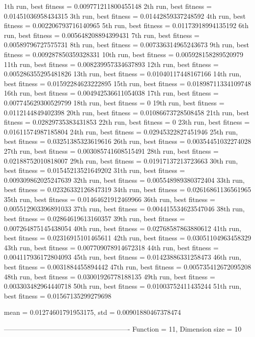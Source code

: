1th run, best fitness = 0.009771211800455148
2th run, best fitness = 0.01451036958434315
3th run, best fitness = 0.01442859337248592
4th run, best fitness = 0.002206793716140965
5th run, best fitness = 0.01173918994135192
6th run, best fitness = 0.005648208894399431
7th run, best fitness = 0.00589796727575731
8th run, best fitness = 0.007336314965243673
9th run, best fitness = 0.009287850359328331
10th run, best fitness = 0.005928158289520979
11th run, best fitness = 0.008239957334637893
12th run, best fitness = 0.005286355295481826
13th run, best fitness = 0.01040117448167166
14th run, best fitness = 0.01592284623222895
15th run, best fitness = 0.01898711334109748
16th run, best fitness = 0.004942536611054038
17th run, best fitness = 0.007745629300529799
18th run, best fitness = 0
19th run, best fitness = 0.0112144849402398
20th run, best fitness = 0.01086673728508458
21th run, best fitness = 0.02829735383431853
22th run, best fitness = 0
23th run, best fitness = 0.01611574987185804
24th run, best fitness = 0.02945322827451946
25th run, best fitness = 0.03251385323619616
26th run, best fitness = 0.00354451032274028
27th run, best fitness = 0.003085741608515491
28th run, best fitness = 0.02188752010818007
29th run, best fitness = 0.01917137213723663
30th run, best fitness = 0.01545213521649202
31th run, best fitness = 0.009309862025247639
32th run, best fitness = 0.005548989380372404
33th run, best fitness = 0.02326332126847319
34th run, best fitness = 0.02616861136561965
35th run, best fitness = 0.01464621912469966
36th run, best fitness = 0.005512903396891033
37th run, best fitness = 0.004415534623547046
38th run, best fitness = 0.02864619613160357
39th run, best fitness = 0.007264875145438054
40th run, best fitness = 0.02768587863880612
41th run, best fitness = 0.02316915101465611
42th run, best fitness = 0.03051104963458329
43th run, best fitness = 0.007709078914672318
44th run, best fitness = 0.004117936172804093
45th run, best fitness = 0.01423886331258473
46th run, best fitness = 0.0031884455894442
47th run, best fitness = 0.005735412672095208
48th run, best fitness = 0.03001926778188135
49th run, best fitness = 0.003303482964440718
50th run, best fitness = 0.01003752411435244
51th run, best fitness = 0.01567135299279698

mean = 0.01274601791953175, std = 0.00901880467378474

-------------------------------------------------------
Function = 11, Dimension size = 10

